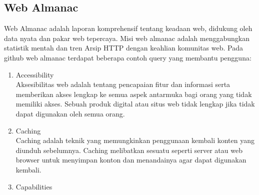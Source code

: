 \subsection{Web Almanac}
Web Almanac adalah laporan komprehensif tentang keadaan web, didukung oleh data nyata dan pakar web tepercaya. Misi web almanac adalah menggabungkan statistik mentah dan tren Arsip HTTP dengan keahlian komunitas web. Pada github web almanac terdapat beberapa contoh query yang membantu pengguna: 
\begin{enumerate}
	\item Accessibility\\
	Aksesibilitas web adalah tentang pencapaian fitur dan informasi serta memberikan akses lengkap ke semua aspek antarmuka bagi orang yang tidak memiliki akses. Sebuah produk digital atau situs web tidak lengkap jika tidak dapat digunakan oleh semua orang. 
	\item Caching\\
	Caching adalah teknik yang memungkinkan penggunaan kembali konten yang diunduh sebelumnya. Caching melibatkan sesuatu seperti server atau web browser untuk menyimpan konton dan menandainya agar dapat digunakan kembali.
	\item Capabilities\\
	

\end{enumerate}
